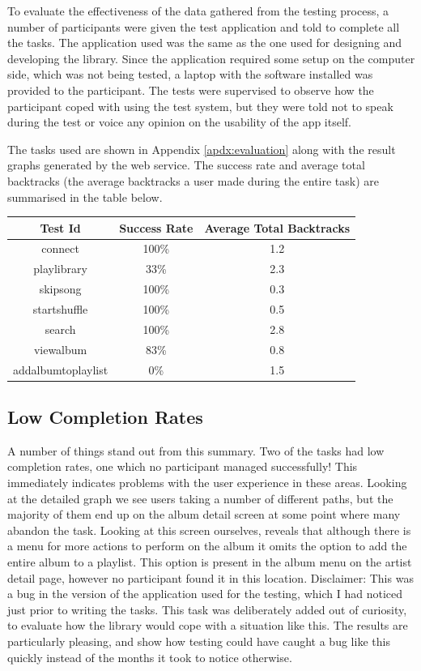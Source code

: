 To evaluate the effectiveness of the data gathered from the testing
process, a number of participants were given the test application
and told to complete all the tasks. The application used was the
same as the one used for designing and developing the library.
Since the application required some setup on the computer side,
which was not being tested, a laptop with the software installed
was provided to the participant. The tests were supervised to observe
how the participant coped with using the test system, but they were told
not to speak during the test or voice any opinion on the usability
of the app itself.

The tasks used are shown in Appendix \ref{apdx:evaluation} along
with the result graphs generated by the web service. The success
rate and average total backtracks (the average backtracks a user
made during the entire task) are summarised in the table below.


\begin{tabular}{| c | c | c |}
\hline
Test Id & Success Rate & Average Total Backtracks \\
\hline
connect & 100\% & 1.2 \\
playlibrary & 33\% & 2.3\\
skipsong & 100\% & 0.3 \\
startshuffle & 100\% & 0.5 \\
search & 100\% & 2.8 \\
viewalbum & 83\% & 0.8 \\
addalbumtoplaylist & 0\% & 1.5 \\
\hline
\end{tabular}

\subsection{Low Completion Rates}

A number of things stand out from this summary. Two of the tasks had low completion
rates, one which no participant managed successfully! This immediately indicates problems with
the user experience in these areas. Looking at the detailed graph we see users taking a
number of different paths, but the majority of them end up on the album detail screen at some
point where many abandon the task. Looking at this screen ourselves, reveals that although
there is a menu for more actions to perform on the album it omits the option to add
the entire album to a playlist. This option is present in the album menu on the artist
detail page, however no participant found it in this location. Disclaimer: This was
a bug in the version of the application used for the testing, which I had noticed just
prior to writing the tasks. This task was deliberately added out of curiosity, to evaluate
how the library would cope with a situation like this. The results are particularly pleasing,
and show how testing could have caught a bug like this quickly instead of the months it took
to notice otherwise.


